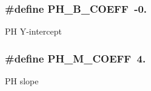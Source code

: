 \subsubsection[{\texorpdfstring{P\+H\+\_\+\+B\+\_\+\+C\+O\+E\+FF}{PH_B_COEFF}}]{\setlength{\rightskip}{0pt plus 5cm}\#define P\+H\+\_\+\+B\+\_\+\+C\+O\+E\+FF~-\/0.}\hypertarget{group___c_a_l___c_o_e_f_f_ga3d9cbf54f9b4b5ac4915d7d176e77bfe}{}\label{group___c_a_l___c_o_e_f_f_ga3d9cbf54f9b4b5ac4915d7d176e77bfe}
PH Y-\/intercept 
\subsubsection[{\texorpdfstring{P\+H\+\_\+\+M\+\_\+\+C\+O\+E\+FF}{PH_M_COEFF}}]{\setlength{\rightskip}{0pt plus 5cm}\#define P\+H\+\_\+\+M\+\_\+\+C\+O\+E\+FF~4.}\hypertarget{group___c_a_l___c_o_e_f_f_gabe5c1bc9018d7fb405b0f69c568d866b}{}\label{group___c_a_l___c_o_e_f_f_gabe5c1bc9018d7fb405b0f69c568d866b}
PH slope 